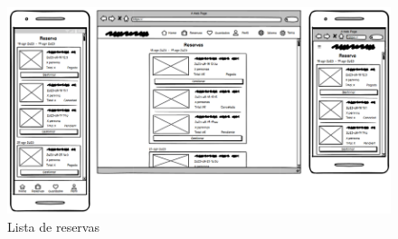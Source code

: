\begin{figure}[H]
	\centering
	\includegraphics[width=0.8\linewidth]{5-AnalisisDelSistemaDeInformacion/InterfacesDeUsuario/Lista de reservas/lista.png}
	\caption{Lista de reservas}
\end{figure}